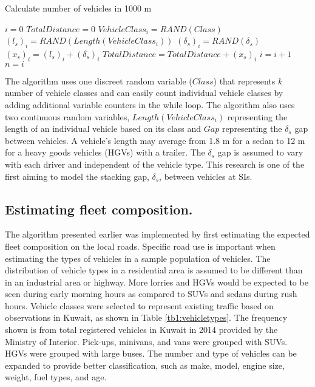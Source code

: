 \begin{algorithm}
\caption{Calculate number of vehicles in 1000 m}
\label{alg:vehcount}
\begin{algorithmic}
\State $i=0$
\State $TotalDistance=0$
\State $VehicleClass_{i} = RAND(Class)$
\State $(l_{s})_{i} = RAND(Length(VehicleClass_{i}))$
\State $(\delta_{s})_{i} = RAND(\delta_{s})$
\State $(x_{s})_{i} =  (l_{s})_{i} + (\delta_{s})_{i}$
\State $TotalDistance = TotalDistance + (x_{s})_{i}$
\State $i = i + 1$
\EndWhile
\State $n = i$
\end{algorithmic}
\end{algorithm}

The algorithm uses one discreet random variable ($Class$) that represents $k$ number of vehicle classes and can easily count individual vehicle classes by adding additional variable counters in the while loop. The algorithm also uses two continuous random variables, $Length(VehicleClass_{i})$ representing the length of an individual vehicle based on its class and $Gap$ representing the $\delta_{s}$ gap between vehicles.  A vehicle's length may average from 1.8 m for a sedan to 12 m for a heavy goods vehicles (HGVs) with a trailer. The $\delta_{s}$ gap is assumed to vary with each driver and independent of the vehicle type. This research is one of the first aiming to model the stacking gap, $\delta_{s}$, between vehicles at SIs.

\subsection{Estimating fleet composition.}

The algorithm presented earlier was implemented by first estimating the expected fleet composition on the local roads. Specific road use is important when estimating the types of vehicles in a sample population of vehicles.  The distribution of vehicle types in a residential area is assumed to be different than in an industrial area or highway. More lorries and HGVs would be expected to be seen during early morning hours as compared to SUVs and sedans during rush hours. Vehicle classes were selected to represent existing traffic based on observations in Kuwait, as shown in Table \ref{tb1:vehicletypes}. The frequency shown is from total registered vehicles in Kuwait in 2014 provided by the Ministry of Interior. Pick-ups, minivans, and vans were grouped with SUVs. HGVs were grouped with large buses. The number and type of vehicles can be expanded to provide better classification, such as make, model, engine size, weight, fuel types, and age.

